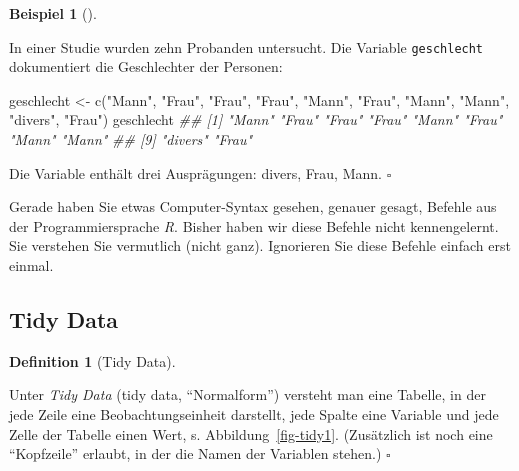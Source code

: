 \documentclass[
  letterpaper,
  twoside,
  open=any]{scrbook}
\newenvironment{Shaded}{\begin{snugshade}}{\end{snugshade}}
\newcommand{\DocumentationTok}[1]{\textcolor[rgb]{0.37,0.37,0.37}{\textit{#1}}}
\newcommand{\FunctionTok}[1]{\textcolor[rgb]{0.28,0.35,0.67}{#1}}
\newcommand{\NormalTok}[1]{\textcolor[rgb]{0.00,0.23,0.31}{#1}}
\newcommand{\OtherTok}[1]{\textcolor[rgb]{0.00,0.23,0.31}{#1}}
\newcommand{\StringTok}[1]{\textcolor[rgb]{0.13,0.47,0.30}{#1}}
\theoremstyle{definition}
\newtheorem{definition}{Definition}[chapter]
\theoremstyle{definition}
\theoremstyle{definition}
\newtheorem{example}{Beispiel}[chapter]
\theoremstyle{remark}
\begin{document}
\begin{example}[]\protect\hypertarget{exm-geschlecht}{}\label{exm-geschlecht}

In einer Studie wurden zehn Probanden untersucht. Die Variable
\texttt{geschlecht} dokumentiert die Geschlechter der Personen:

\begin{Shaded}
\begin{Highlighting}[]
\NormalTok{geschlecht }\OtherTok{\textless{}{-}} \FunctionTok{c}\NormalTok{(}\StringTok{"Mann"}\NormalTok{, }\StringTok{"Frau"}\NormalTok{, }\StringTok{"Frau"}\NormalTok{, }\StringTok{"Frau"}\NormalTok{, }\StringTok{"Mann"}\NormalTok{,}
                \StringTok{"Frau"}\NormalTok{, }\StringTok{"Mann"}\NormalTok{, }\StringTok{"Mann"}\NormalTok{, }\StringTok{"divers"}\NormalTok{, }\StringTok{"Frau"}\NormalTok{)}
\NormalTok{geschlecht}
\DocumentationTok{\#\#  [1] "Mann"   "Frau"   "Frau"   "Frau"   "Mann"   "Frau"   "Mann"   "Mann"  }
\DocumentationTok{\#\#  [9] "divers" "Frau"}
\end{Highlighting}
\end{Shaded}

Die Variable enthält drei Ausprägungen: divers, Frau, Mann. \(\square\)

\end{example}

\begin{tcolorbox}[enhanced jigsaw, colbacktitle=quarto-callout-tip-color!10!white, colframe=quarto-callout-tip-color-frame, coltitle=black, arc=.35mm, breakable, opacitybacktitle=0.6, toprule=.15mm, colback=white, rightrule=.15mm, opacityback=0, toptitle=1mm, title=\textcolor{quarto-callout-tip-color}{\faLightbulb}\hspace{0.5em}{Tipp}, titlerule=0mm, bottomtitle=1mm, bottomrule=.15mm, leftrule=.75mm, left=2mm]

Gerade haben Sie etwas Computer-Syntax gesehen, genauer gesagt, Befehle
aus der Programmiersprache \emph{R}. Bisher haben wir diese Befehle
nicht kennengelernt. Sie verstehen Sie vermutlich (nicht ganz).
Ignorieren Sie diese Befehle einfach erst einmal.

\end{tcolorbox}

\subsection{Tidy Data}\label{tidy-data}

\begin{definition}[Tidy
Data]\protect\hypertarget{def-tidy}{}\label{def-tidy}

Unter \emph{Tidy Data} (tidy data, \enquote{Normalform}) versteht man
eine Tabelle, in der jede Zeile eine Beobachtungseinheit darstellt, jede
Spalte eine Variable und jede Zelle der Tabelle einen Wert, s.
Abbildung~\ref{fig-tidy1}. (Zusätzlich ist noch eine \enquote{Kopfzeile}
erlaubt, in der die Namen der Variablen stehen.) \(\square\)

\end{definition}
\end{document}
